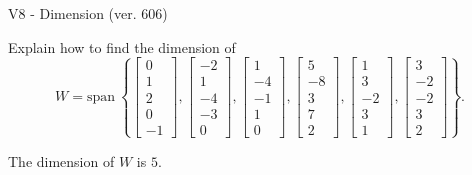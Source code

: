 \begin{exercise}
  \begin{exerciseTitle}V8 - Dimension (ver. 606)\end{exerciseTitle}
  \begin{exerciseStatement}
    Explain how to find the dimension of 
\[W=\mathrm{span}\ \left\{\left[\begin{array}{r}
0 \\
1 \\
2 \\
0 \\
-1
\end{array}\right] , \left[\begin{array}{r}
-2 \\
1 \\
-4 \\
-3 \\
0
\end{array}\right] , \left[\begin{array}{r}
1 \\
-4 \\
-1 \\
1 \\
0
\end{array}\right] , \left[\begin{array}{r}
5 \\
-8 \\
3 \\
7 \\
2
\end{array}\right] , \left[\begin{array}{r}
1 \\
3 \\
-2 \\
3 \\
1
\end{array}\right] , \left[\begin{array}{r}
3 \\
-2 \\
-2 \\
3 \\
2
\end{array}\right]\right\}.\]



  \end{exerciseStatement}
  \begin{exerciseAnswer}
   The dimension of \(W\) is  \(5\).
  


  \end{exerciseAnswer}
\end{exercise}